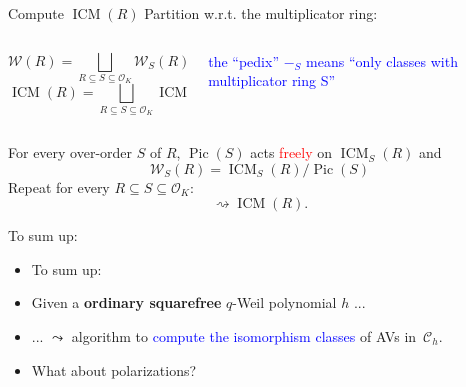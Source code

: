 \documentclass[usenames,dvipsnames]{beamer}
\DeclareMathOperator{\ICM}{ICM}
\DeclareMathOperator{\Pic}{Pic}
\newcommand{\cC}{{\mathcal C}}
\newcommand{\cO}{{\mathcal O}}
\newcommand{\cW}{{\mathcal W}}
\newcommand{\red}[1]{\textcolor{red}{#1}}
\newcommand{\blue}[1]{\textcolor{blue}{#1}}
\begin{document}
\begin{frame}{ Compute $\ICM(R)$ }
\pause 
	Partition w.r.t. the multiplicator ring:
	\begin{columns}
	\begin{column}{0.5\textwidth}
		\[ \cW(R) = \bigsqcup_{R\subseteq S \subseteq \cO_K} \cW_S(R)\]
		\[ \ICM(R) = \bigsqcup_{R\subseteq S \subseteq \cO_K} \ICM_S(R)\]
	\end{column}
\pause
	\begin{column}{0.5\textwidth}  %
	\begin{center}
	\textcolor{blue}{\parbox{10em}{the ``pedix'' $-_S$ means ``only classes with multiplicator ring S''}} 
	\end{center}
	\end{column}
	\end{columns}
\pause
	\begin{theorem}[M.]
	For every over-order $S$ of $R$, $\Pic(S)$ acts \red{freely} on $\ICM_S(R)$ and
	\[ \cW_S(R) = \ICM_S(R) / \Pic(S) \]
\pause
	Repeat for every $R\subseteq S \subseteq \cO_K$:
	\[ \rightsquigarrow \ICM(R).\]
	\end{theorem}
\end{frame}

\begin{frame}{ To sum up: }
	\begin{itemize}
	\item To sum up:
\pause
	\item Given a {\bf ordinary squarefree} $q$-Weil polynomial $h$ ...
\pause
	\item ... $\leadsto$ algorithm to \blue{compute the isomorphism classes} of AVs in~$\cC_h$.
\pause    
	\item What about polarizations?
	\end{itemize}
\end{frame}
\end{document}
